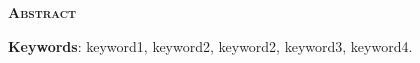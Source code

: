 
\vspace*{45pt}
\begin{flushleft}
	{\Large \textbf{\scshape{Abstract}}}
\end{flushleft}
\vspace*{10pt}


\amostradetexto


\vspace*{20pt}

\noindent \textbf{Keywords}:
keyword1, keyword2, keyword2, keyword3, keyword4.

